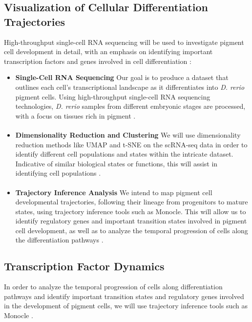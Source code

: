 \documentclass[runningheads]{llncs}
\begin{document}
\subsection{Visualization of Cellular Differentiation Trajectories}
High-throughput single-cell RNA sequencing will be used to investigate pigment cell development in detail, with an emphasis on identifying important transcription factors and genes involved in cell differentiation \cite{srivatsan2020massively,kulkarni2019beyond}:
    \begin{itemize}
        \item \textbf{Single-Cell RNA Sequencing}
        Our goal is to produce a dataset that outlines each cell's transcriptional landscape as it differentiates into \textit{D. rerio} pigment cells. Using high-throughput single-cell RNA sequencing technologies, \textit{D. rerio} samples from different embryonic stages are processed, with a focus on tissues rich in pigment \cite{srivatsan2020massively}.
        \paragraph{}
        \item \textbf{Dimensionality Reduction and Clustering}
        We will use dimensionality reduction methods like UMAP and t-SNE on the scRNA-seq data in order to identify different cell populations and states within the intricate dataset. Indicative of similar biological states or functions, this will assist in identifying cell populations \cite{kulkarni2019beyond,nayak2021hitchhiker}.
        \paragraph{}
        \item \textbf{Trajectory Inference Analysis}
        We intend to map pigment cell developmental trajectories, following their lineage from progenitors to mature states, using trajectory inference tools such as Monocle. This will allow us to identify regulatory genes and important transition states involved in pigment cell development, as well as to analyze the temporal progression of cells along the differentiation pathways \cite{qiu2017reversed}.        
    \end{itemize}
    
\subsection{Transcription Factor Dynamics}
In order to analyze the temporal progression of cells along differentiation pathways and identify important transition states and regulatory genes involved in the development of pigment cells, we will use trajectory inference tools such as Monocle \cite{qiu2017reversed}.
\end{document}
